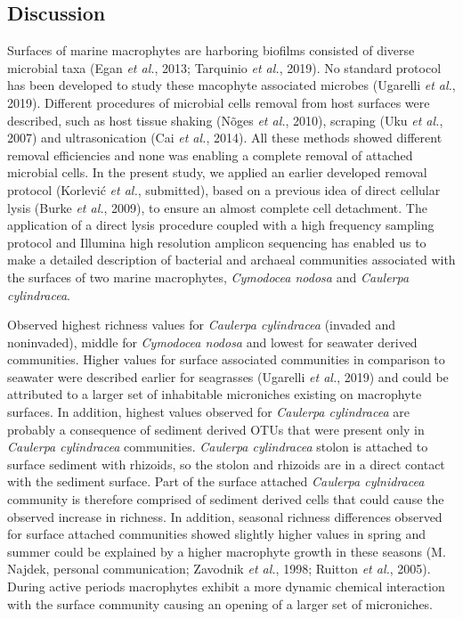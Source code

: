 \documentclass[12pt,]{article}
\begin{document}
\hypertarget{discussion}{%
\subsection{Discussion}\label{discussion}}

Surfaces of marine macrophytes are harboring biofilms consisted of
diverse microbial taxa (Egan \emph{et al.}, 2013; Tarquinio \emph{et
al.}, 2019). No standard protocol has been developed to study these
macophyte associated microbes (Ugarelli \emph{et al.}, 2019). Different
procedures of microbial cells removal from host surfaces were described,
such as host tissue shaking (Nõges \emph{et al.}, 2010), scraping (Uku
\emph{et al.}, 2007) and ultrasonication (Cai \emph{et al.}, 2014). All
these methods showed different removal efficiencies and none was
enabling a complete removal of attached microbial cells. In the present
study, we applied an earlier developed removal protocol (Korlević
\emph{et al.}, submitted), based on a previous idea of direct cellular
lysis (Burke \emph{et al.}, 2009), to ensure an almost complete cell
detachment. The application of a direct lysis procedure coupled with a
high frequency sampling protocol and Illumina high resolution amplicon
sequencing has enabled us to make a detailed description of bacterial
and archaeal communities associated with the surfaces of two marine
macrophytes, \emph{Cymodocea nodosa} and \emph{Caulerpa cylindracea}.

Observed highest richness values for \emph{Caulerpa cylindracea}
(invaded and noninvaded), middle for \emph{Cymodocea nodosa} and lowest
for seawater derived communities. Higher values for surface associated
communities in comparison to seawater were described earlier for
seagrasses (Ugarelli \emph{et al.}, 2019) and could be attributed to a
larger set of inhabitable microniches existing on macrophyte surfaces.
In addition, highest values observed for \emph{Caulerpa cylindracea} are
probably a consequence of sediment derived OTUs that were present only
in \emph{Caulerpa cylindracea} communities. \emph{Caulerpa cylindracea}
stolon is attached to surface sediment with rhizoids, so the stolon and
rhizoids are in a direct contact with the sediment surface. Part of the
surface attached \emph{Caulerpa cylnidracea} community is therefore
comprised of sediment derived cells that could cause the observed
increase in richness. In addition, seasonal richness differences
observed for surface attached communities showed slightly higher values
in spring and summer could be explained by a higher macrophyte growth in
these seasons (M. Najdek, personal communication; Zavodnik \emph{et
al.}, 1998; Ruitton \emph{et al.}, 2005). During active periods
macrophytes exhibit a more dynamic chemical interaction with the surface
community causing an opening of a larger set of microniches.
\end{document}
